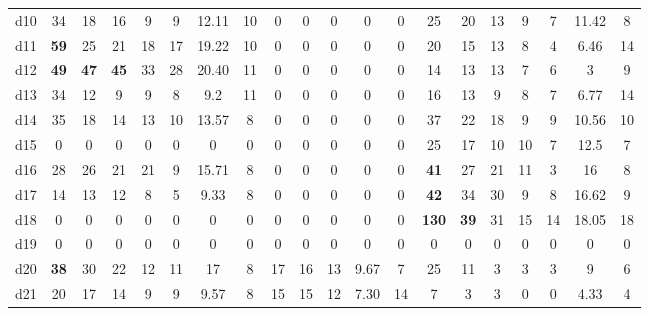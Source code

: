 \begin{tabular*}{\linewidth}{ @{\extracolsep{\fill}}c | ccccccc | ccccc | ccccccc @{}}
d10 &  34 & 18  &  16  &  9  &  9 &  12.11  &  10 
     & 0 & 0  &  0  &  0  &  0   
    &  25 & 20  &  13  &  9  &  7 &  11.42  &  8  \\

d11 &  \textbf{{\color{red}59}} & 25 & 21  &  18  &  17 &  19.22  &  10 
     & 0 & 0  &  0  &  0  &  0   
    &  20 & 15  &  13  &  8  &  4 &  6.46  &  14  \\

d12 &  \textbf{{\color{red}49}}& \textbf{{\color{red}47}} & \textbf{{\color{red}45}}  &  33  & 28  & 20.40  &  11 
     & 0 & 0  &  0  &  0  &  0   
    &  14 & 13  & 13  &  7  &  6 &  3  &  9  \\

d13 &  34 & 12  &  9  & 9  &  8 &  9.2  & 11 
     & 0 & 0  &  0  &  0  &  0   
    &  16 & 13  & 9  &  8  &  7 &  6.77  &  14  \\

d14 &  35 & 18  & 14  &  13  &  10 &  13.57  &  8 
     & 0 & 0  &  0  &  0  &  0   
      &  37 & 22  &  18  &  9  &  9 &  10.56  &  10\\

d15 & 0 & 0 & 0  &  0  &0  &  0  &  0 
     & 0 & 0  &  0  &  0  &  0 
     &  25 & 17  &  10  &  10  & 7 &  12.5  &  7\\

d16 & 28 & 26  &  21  &  21  &  9 &  15.71  &  8 
     & 0 & 0  &  0  &  0  &  0   
    &  \textbf{{\color{red}41}} & 27  &  21  &  11  &  3 &  16  &  8  \\

d17  & 14  &  13  &12 & 8 &5 &  9.33  &  8   
& 0 & 0  &  0  &  0  &  0   
    &  \textbf{{\color{red}42}} & 34  &  30  &  9  & 8 &  16.62  &  9  \\

d18 &  0 & 0  &  0  &  0  &  0 &  0  &  0 
     & 0 & 0  &  0  &  0  &  0   
    &  \textbf{{\color{red}130}} & \textbf{{\color{red}39}}  &  31  &  15  &  14 &  18.05  &  18  \\

d19 &  0 & 0  &  0  &  0  &  0 &  0  &  0 
     & 0 & 0  &  0  &  0  &  0   
    &  0 & 0  &  0  &  0  &  0 &  0  &  0  \\

d20 &  \textbf{{\color{red}38}} & 30  &  22  &  12  &  11 &  17  &  8 
     & 17 & 16  &  13  &  9.67  &  7   
    &  25 & 11  &  3  &  3  &  3 &  9  &  6  \\

d21 &  20 & 17  &  14  &  9  &  9 &  9.57  &  8 
     & 15 & 15  &  12  &  7.30  &  14   
    &  7 & 3  &  3  &  0 &  0 &  4.33  &  4 \\


\end{tabular*}
